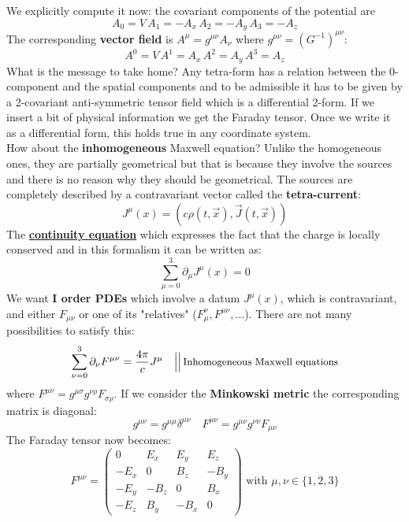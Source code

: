 \documentclass[../main.tex]{subfiles}
\begin{document}
We explicitly compute it now: the covariant components of the potential are
\[
A_0=V \, A_1=-A_x \, A_2=-A_y \, A_3=-A_z
\]
The corresponding \textbf{vector field} is {\color{red}$A^{\mu}=g^{\mu\nu}A_{\nu}$} where $g^{\mu\nu}=(G^{-1})^{\mu\nu}$:
\[
A^0=V \, A^1=A_x \, A^2=A_y \, A^3=A_z
\]
What is the message to take home? Any tetra-form has a relation between the 0-component and the spatial components and to be admissible it has to be given by a 2-covariant anti-symmetric tensor field which is a differential 2-form. If we insert a bit of physical information we get the Faraday tensor. Once we write it as a differential form, this holds true in any coordinate system.\\
How about the \textbf{inhomogeneous} Maxwell equation? Unlike the homogeneous ones, they are partially geometrical but that is because they involve the sources and there is no reason why they should be geometrical. The sources are completely described by a contravariant vector called the \textbf{tetra-current}:
\[
J^{\mu}(x)=(c\rho(t,\vec{x}),\vec{J}(t,\vec{x}))
\]
The \underline{\textbf{continuity equation}} which expresses the fact that the charge is locally conserved and in this formalism it can be written as:
\[
\sum_{\mu=0}^3\partial_{\mu}J^{\mu}(x)=0
\]
We want \textbf{I order PDEs} which involve a datum $J^{\mu}(x)$, which is contravariant, and either $F_{\mu\nu}$ or one of its "relatives" ($F_{\mu}^{\nu},F^{\mu\nu},\dots$). There are not many possibilities to satisfy this:
\[
\sum_{\nu=0}^3\partial_{\nu}F^{\mu\nu}=\frac{4\pi}{c}J^{\mu} \quad \Big| \Big| \,\small{\text{Inhomogeneous Maxwell equations}}
\]
where $F^{\mu\nu}=g^{\mu\sigma}g^{\nu\rho}F_{\sigma\rho}$. If we consider the \textbf{Minkowski metric} the corresponding matrix is diagonal:
\[
g^{\mu\nu}=g^{\mu\mu}\delta^{\mu\nu} \quad F^{\mu\nu}=g^{\mu\nu}g^{\nu\nu}F_{\mu\nu}
\]
The Faraday tensor now becomes:
\[
F^{\mu\nu}=\begin{pmatrix}
0 & E_x & E_y & E_z \\
-E_x & 0 & B_z & -B_y \\
-E_y & -B_z & 0 & B_x \\
-E_z & B_y & -B_x & 0
\end{pmatrix}
\text{ with } \mu,\nu\in\{1,2,3\}
\]
\end{document}
